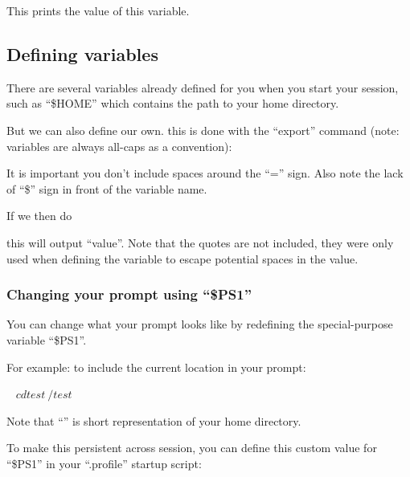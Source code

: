 \begin{prompt}
\end{prompt}

This prints the value of this variable.

\subsection{Defining variables}

There are several variables already defined for you when you start your
session, such as ``\$HOME'' which contains the path to your home directory. 

But we can also define our own. this is done with the ``export'' command (note:
variables are always all-caps as a convention):

\begin{prompt} 
\end{prompt}

It is important you don't include spaces around the ``='' sign. Also note
the lack of ``\$'' sign in front of the variable name.

If we then do

\begin{prompt}
\end{prompt}

this will output ``value''. Note that the quotes are not included, they were
only used when defining the variable to escape potential spaces in the value.

\subsubsection{Changing your prompt using ``\$PS1''}

You can change what your prompt looks like by redefining the special-purpose
variable ``\$PS1''.

For example: to include the current location in your prompt:

\begin{prompt}
~ $ cd test
~/test $
\end{prompt}

Note that ``\tilde'' is short representation of your home directory.

To make this persistent across session, you can define this custom value for
``\$PS1'' in your ``.profile'' startup script:

